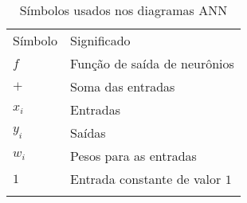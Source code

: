 
\begin{table}
\caption{Símbolos usados nos diagramas ANN}
\label{tab.ann-symbols}
\begin{tabular}{p{2cm}p{4cm}}
\hline\noalign{\smallskip}
Símbolo & Significado \\
\noalign{\smallskip}\hline\noalign{\smallskip}
$f$ & Função de saída de neurônios\\
$+$ & Soma das entradas\\
$x_i$ & Entradas\\
$y_i$ & Saídas\\
$w_{i}$ & Pesos para as entradas\\
$1$ & Entrada constante de valor $1$\\
\noalign{\smallskip}\hline\noalign{\smallskip}
\end{tabular}
\end{table}

